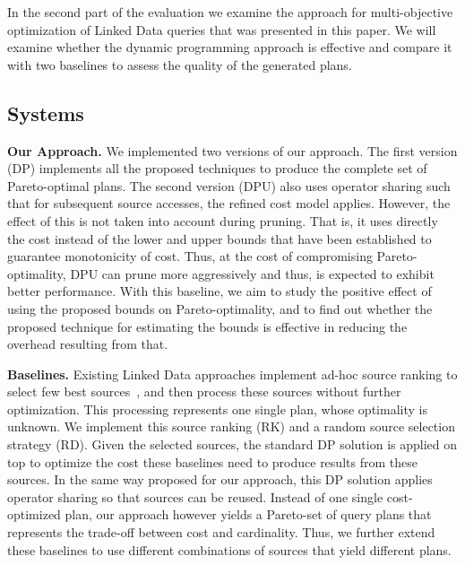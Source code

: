 
In the second part of the evaluation we examine the approach for
multi-objective optimization of Linked Data queries that was presented
in this paper. We will examine whether the dynamic programming
approach is effective and compare it with two baselines to assess the
quality of the generated plans.

\subsection{Systems}
\textbf{Our Approach.} We implemented two versions of our
approach. The first version (DP) implements all the proposed techniques to produce the complete set of Pareto-optimal plans. The second
version (DPU) also uses operator sharing such that for subsequent source accesses, the refined cost model applies. However, the effect of this is not taken into account during pruning.  That is, it uses directly the cost instead of the lower and upper bounds that have been established to guarantee monotonicity of cost. Thus, at the cost of compromising Pareto-optimality, DPU can prune more aggressively and thus, is expected to exhibit better performance. With this baseline, we aim to study the positive effect of using the proposed bounds on Pareto-optimality, and to find out whether the proposed technique for estimating the bounds is effective in reducing the overhead resulting from that.


\textbf{Baselines.} Existing Linked Data approaches implement ad-hoc source ranking to select few best sources~\cite{harth_data_2010,ladwig_linked_2010}, and then process these sources without further optimization. This processing represents one single plan, whose optimality is unknown. We implement this source ranking (RK) and a random source selection strategy (RD). Given the selected sources, the standard DP solution is applied on top to optimize the cost these baselines need to produce results from these sources. In the same way proposed for our approach, this DP solution applies operator sharing so that sources can be reused. Instead of one single cost-optimized plan, our approach however yields a Pareto-set of query plans that represents the trade-off between cost and cardinality. Thus, we further extend these baselines to use different combinations of sources that yield different plans. 

